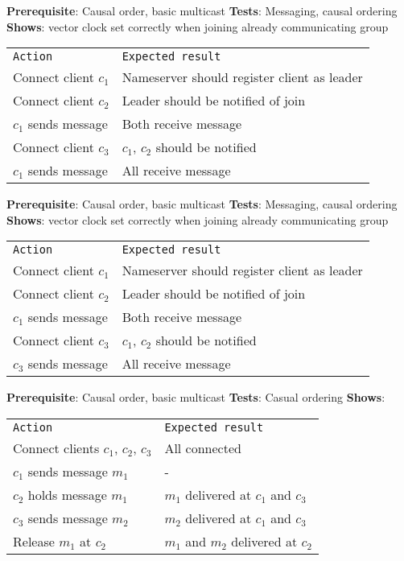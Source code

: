 
	\textbf{Prerequisite}: Causal order, basic multicast
	\textbf{Tests}: Messaging, causal ordering
	\textbf{Shows}: vector clock set correctly when joining already communicating group

	\begin{tabular}{ll}
		\texttt{Action} & \texttt{Expected result} \\
		Connect client $c_1$ & Nameserver should register client as leader \\
		Connect client $c_2$ & Leader should be notified of join \\
		$c_1$ sends message & Both receive message \\
		Connect client $c_3$ & $c_1$, $c_2$ should be notified \\
		$c_1$ sends message & All receive message \\
	\end{tabular}

	\textbf{Prerequisite}: Causal order, basic multicast
	\textbf{Tests}: Messaging, causal ordering
	\textbf{Shows}: vector clock set correctly when joining already communicating group
	\begin{tabular}{ll}
		\texttt{Action} & \texttt{Expected result} \\
		Connect client $c_1$ & Nameserver should register client as leader \\
		Connect client $c_2$ & Leader should be notified of join \\
		$c_1$ sends message & Both receive message \\
		Connect client $c_3$ & $c_1$, $c_2$ should be notified \\
		$c_3$ sends message & All receive message \\
	\end{tabular}


	\textbf{Prerequisite}: Causal order, basic multicast
	\textbf{Tests}: Casual ordering
	\textbf{Shows}: 

	\begin{tabular}{ll}
		\texttt{Action} & \texttt{Expected result} \\
		Connect clients $c_1$, $c_2$, $c_3$ & All connected\\
		$c_1$ sends message $m_1$ & -\\
		$c_2$ holds message $m_1$ & $m_1$ delivered at $c_1$ and $c_3$ \\
		$c_3$ sends message $m_2$ & $m_2$ delivered at $c_1$ and $c_3$ \\
		Release $m_1$ at $c_2$ & $m_1$ and $m_2$ delivered at $c_2$ \\
	\end{tabular}


